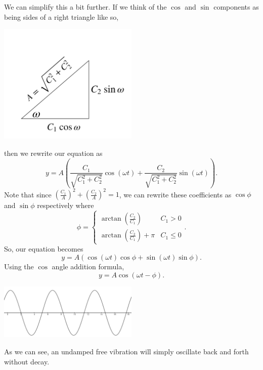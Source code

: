 \noindent
We can simplify this a bit further. If we think of the $\cos$ and $\sin$ components as being sides of a right triangle like so,
\begin{center}
	\includegraphics[width=0.5\textwidth]{./higherOrder/freeVibrs/triangle.png}
\end{center}
then we rewrite our equation as
\begin{equation*}
	y = A\left( \frac{C_1}{\sqrt{C_1^2 + C_2^2}}\cos{(\omega t)} + \frac{C_2}{\sqrt{C_1^2 + C_2^2}}\sin{(\omega t)} \right).
\end{equation*}
Note that since $\left(\frac{C_1}{A}\right)^2 + \left(\frac{C_2}{A}\right)^2 = 1$, we can rewrite these coefficients as $\cos{\phi}$ and $\sin{\phi}$ respectively where
\begin{equation*}
	\phi = \begin{cases}
		\arctan{(\frac{C_2}{C_1})} & C_1 > 0 \\
		\arctan{(\frac{C_2}{C_1})} + \pi & C_1 \leq 0
	\end{cases}.
\end{equation*} 
So, our equation becomes
\begin{equation*}
	y = A\left(\cos{(\omega t)}\cos{\phi} + \sin{(\omega t)}\sin{\phi}\right).
\end{equation*}
Using the $\cos$ angle addition formula,
\begin{equation*}
	y = A\cos{(\omega t - \phi)}.
\end{equation*}
\begin{center}
	\includegraphics[width=0.5\textwidth]{./higherOrder/freeVibrs/undampedfree.png}
\end{center}
As we can see, an undamped free vibration will simply oscillate back and forth without decay.

